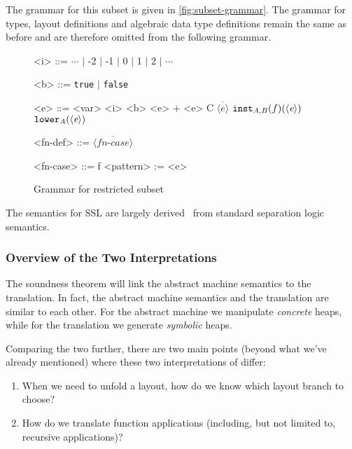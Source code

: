 The grammar for this subset is given in \autoref{fig:subset-grammar}. The grammar for types, layout definitions and algebraic data type definitions remain the same
as before and are therefore omitted from the following grammar.


\begin{figure}
\begin{grammar}
  <i> ::= $\cdots$ $\mid$ -2 $\mid$ -1 $\mid$ 0 $\mid$ 1 $\mid$ 2 $\mid$ $\cdots$

  <b> ::= \texttt{true} $\mid$ \texttt{false}

  <e> ::= <var> \alt <i> \alt <b> \alt <e> + <e> \alt C $\overline{\langle e \rangle}$ \alt $\texttt{inst}_{A,B}(f)(\langle \textit{e} \rangle)$ \alt $\texttt{lower}_{A}(\langle \textit{e} \rangle)$

  <fn-def> ::= $\overline{\langle \textit{fn-case} \rangle}$

  <fn-case> ::= f <pattern> := <e>
\end{grammar}
  \caption{Grammar for restricted \tool subset}
  \label{fig:subset-grammar}
\end{figure}

\noindent
The semantics for SSL are largely derived~\cite{polikarpova:2019:suslik} from standard separation logic semantics.~\cite{rowe:2017:auto-cyclic-term}

\subsubsection{Overview of the Two Interpretations}

The soundness theorem will link the abstract machine semantics to the translation. In fact, the abstract machine
semantics and the translation are similar to each other. For the abstract machine we manipulate \textit{concrete} heaps, while
for the translation we generate \textit{symbolic} heaps.

Comparing the two further, there are two main points (beyond what we've already mentioned) where these two interpretations of \tool differ:


      \begin{enumerate}
        \item When we need to unfold a layout, how do we know which layout branch to choose?
        \item How do we translate function applications (including, but not limited to, recursive applications)?
      \end{enumerate}

